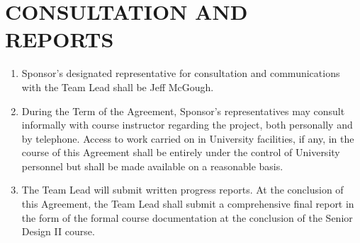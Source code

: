 \section{CONSULTATION AND REPORTS}     
\begin{enumerate}  \itemsep4pt \parskip0pt 
\item  Sponsor's designated representative for consultation and       communications with the Team Lead shall be Jeff McGough.

\item During the Term of the Agreement, Sponsor's representatives may       consult informally with course instructor regarding the       project, both personally and by telephone. Access to work carried       on in University facilities, if any, in the course of this Agreement shall       be entirely under the control of University personnel but shall be       made available on a reasonable basis.    

\item The Team Lead will submit written progress reports. At the conclusion of this Agreement, the Team Lead shall submit a comprehensive final report in the form of the formal course documentation at the conclusion of the Senior Design II course. 
\end{enumerate}

